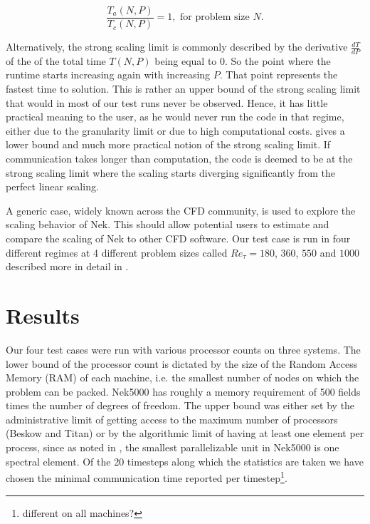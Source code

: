 \documentclass{sig-alternate}
\begin{document}
\begin{equation}
  \dfrac{T_a(N,P)}{T_c(N,P)}=1,\mbox{ for problem size }N.
  \label{eq:strong}
\end{equation} 

\noindent Alternatively, the strong scaling limit is commonly described by the
derivative $\frac{dT}{dP}$ of the
of the total time $T(N,P)$ being equal to $0$. So the point where the runtime
starts increasing again with increasing $P$. That point represents the fastest
time to solution. This is rather an upper bound of the strong scaling
limit that would in most of our test runs never be observed. Hence, it has
little practical meaning to the user, as he would never run the code in that
regime, either due to the granularity limit or due to high computational costs.  gives a lower bound and much more practical notion of the strong
scaling limit. If communication takes longer than
computation, the code is deemed to be at the strong scaling limit where the
scaling starts diverging significantly from the perfect linear scaling. 

A generic case, widely known across the CFD community, is used to explore the
scaling behavior of Nek. This should allow potential users to estimate and
compare the scaling of Nek to other CFD software.
Our test case is run in four different regimes at 4 different problem sizes called
$Re_{\tau} = 180$, $360$, $550$ and $1000$ described more in
detail in .

\section{Results}

Our four test cases were run with various processor counts on three systems. The lower bound of the processor count is dictated by the size of the Random Access Memory (RAM) of each machine, i.e. the smallest number of nodes on which the problem can be packed. Nek5000 has roughly a memory requirement of 500 fields 
times the number of degrees of freedom. The upper bound was either set by the
administrative limit of getting access to the maximum number of processors
(Beskow and Titan) or by the algorithmic limit of having at least one element per process, since as noted in , the smallest parallelizable unit in Nek5000 is one spectral element. 
Of the 20 timesteps along which the statistics are taken we have chosen the minimal communication time reported per timestep\footnote{different on all machines?}. 
\end{document}
